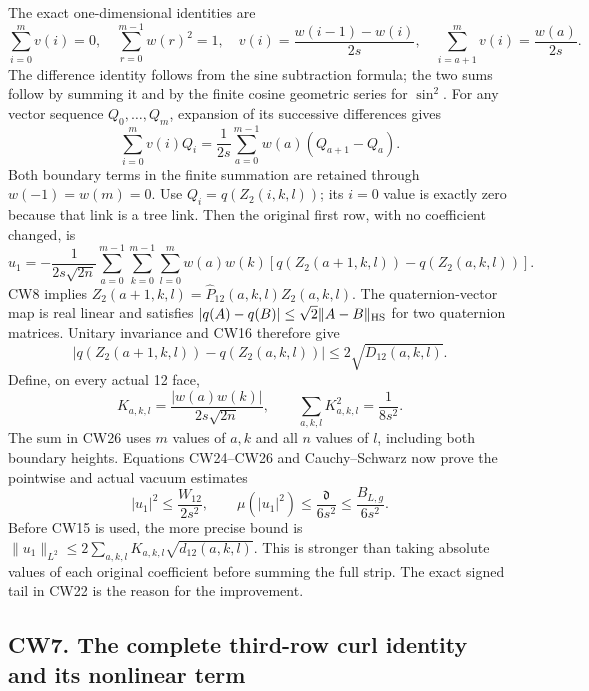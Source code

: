 \documentclass[11pt]{article}
\begin{document}
The exact one-dimensional identities are
\[
 \sum_{i=0}^m v(i)=0,\quad \sum_{r=0}^{m-1}w(r)^2=1,
 \quad v(i)=\frac{w(i-1)-w(i)}{2s},
 \quad \sum_{i=a+1}^m v(i)=\frac{w(a)}{2s}.                \tag{CW22}
\]
The difference identity follows from the sine subtraction formula;
the two sums follow by summing it and by the finite cosine
geometric series for \(\sin^2\). For any vector sequence
\(Q_0,\ldots,Q_m\), expansion of its successive differences gives
\[
 \sum_{i=0}^m v(i)Q_i
 =\frac1{2s}\sum_{a=0}^{m-1}w(a)(Q_{a+1}-Q_a).            \tag{CW23}
\]
Both boundary terms in the finite summation are retained through
\(w(-1)=w(m)=0\). Use \(Q_i=q(Z_2(i,k,l))\); its \(i=0\)
value is exactly zero because that link is a tree link. Then
the original first row, with no coefficient changed, is
\[
 \boxed{u_1=-\frac1{2s\sqrt{2n}}
 \sum_{a=0}^{m-1}\sum_{k=0}^{m-1}\sum_{l=0}^m
 w(a)w(k)[q(Z_2(a+1,k,l))-q(Z_2(a,k,l))].}                 \tag{CW24}
\]
CW8 implies
\(Z_2(a+1,k,l)=\widehat P_{12}(a,k,l)Z_2(a,k,l)\).
The quaternion-vector map is real linear and satisfies
\(|q(A)-q(B)|\le\sqrt2\|A-B\|_{\rm HS}\) for two quaternion
matrices. Unitary invariance and CW16 therefore give
\[
 |q(Z_2(a+1,k,l))-q(Z_2(a,k,l))|\le2\sqrt{D_{12}(a,k,l)}.
                                                               \tag{CW25}
\]
Define, on every actual 12 face,
\[
 K_{a,k,l}=\frac{|w(a)w(k)|}{2s\sqrt{2n}},\qquad
 \sum_{a,k,l}K_{a,k,l}^2=\frac1{8s^2}.                    \tag{CW26}
\]
The sum in CW26 uses \(m\) values of \(a,k\) and all \(n\)
values of \(l\), including both boundary heights. Equations
CW24–CW26 and Cauchy–Schwarz now prove the pointwise and actual
vacuum estimates
\[
 \boxed{|u_1|^2\le\frac{W_{12}}{2s^2},\qquad
 \mu(|u_1|^2)\le\frac{\mathfrak d}{6s^2}
                 \le\frac{B_{L,g}}{6s^2}.}               \tag{CW27}
\]
Before CW15 is used, the more precise bound is
\(\|u_1\|_{L^2}\le2\sum_{a,k,l}K_{a,k,l}\sqrt{d_{12}(a,k,l)}\).
This is stronger than taking absolute values of each original
coefficient before summing the full strip. The exact signed
tail in CW22 is the reason for the improvement.

\subsection*{CW7. The complete third-row curl identity and its nonlinear term}
\end{document}
